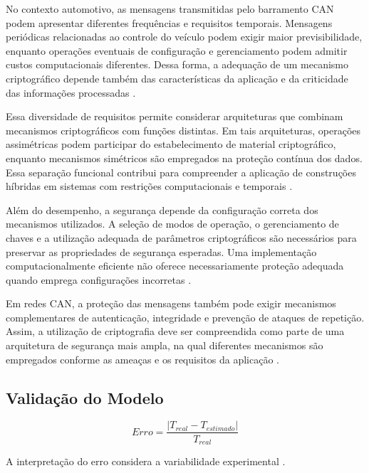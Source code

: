 No contexto automotivo, as mensagens transmitidas pelo barramento CAN podem apresentar diferentes frequências e requisitos temporais. Mensagens periódicas relacionadas ao controle do veículo podem exigir maior previsibilidade, enquanto operações eventuais de configuração e gerenciamento podem admitir custos computacionais diferentes. Dessa forma, a adequação de um mecanismo criptográfico depende também das características da aplicação e da criticidade das informações processadas \cite{gunes2014survey,petit2014potential}.

Essa diversidade de requisitos permite considerar arquiteturas que combinam mecanismos criptográficos com funções distintas. Em tais arquiteturas, operações assimétricas podem participar do estabelecimento de material criptográfico, enquanto mecanismos simétricos são empregados na proteção contínua dos dados. Essa separação funcional contribui para compreender a aplicação de construções híbridas em sistemas com restrições computacionais e temporais \cite{luo2021can,menezes2018handbook}.

Além do desempenho, a segurança depende da configuração correta dos mecanismos utilizados. A seleção de modos de operação, o gerenciamento de chaves e a utilização adequada de parâmetros criptográficos são necessários para preservar as propriedades de segurança esperadas. Uma implementação computacionalmente eficiente não oferece necessariamente proteção adequada quando emprega configurações incorretas \cite{ferguson2011cryptography,mcgrew2008security}.

Em redes CAN, a proteção das mensagens também pode exigir mecanismos complementares de autenticação, integridade e prevenção de ataques de repetição. Assim, a utilização de criptografia deve ser compreendida como parte de uma arquitetura de segurança mais ampla, na qual diferentes mecanismos são empregados conforme as ameaças e os requisitos da aplicação \cite{groza2012libra,parno2005challenges}.

\subsection{Validação do Modelo}

\begin{equation}
Erro = \frac{|T_{real} - T_{estimado}|}{T_{real}}
\end{equation}

A interpretação do erro considera a variabilidade experimental \cite{jain2010art}.

